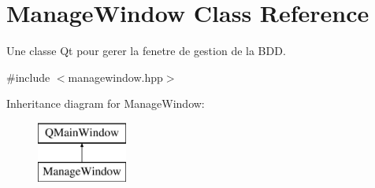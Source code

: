 \hypertarget{classManageWindow}{}\section{Manage\+Window Class Reference}
\label{classManageWindow}


Une classe Qt pour gerer la fenetre de gestion de la B\+DD.  




{\ttfamily \#include $<$managewindow.\+hpp$>$}

Inheritance diagram for Manage\+Window\+:\begin{figure}[H]
\begin{center}
\leavevmode
\includegraphics[height=2.000000cm]{classManageWindow}
\end{center}
\end{figure}
